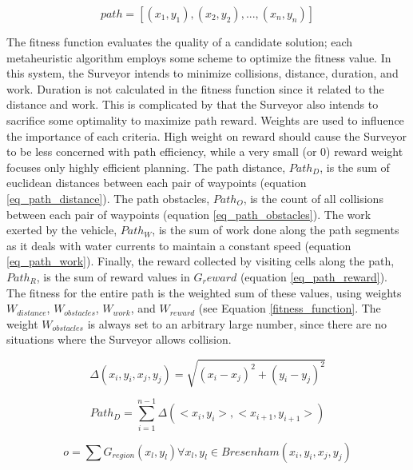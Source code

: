\documentclass{tamuccthesis}
\begin{document}
\begin{equation}
path = [ (x_{1}, y_{1}), (x_{2}, y_{2}), ..., (x_{n}, y_{n}) ]
\label{solution_path}
\end{equation}

The fitness function evaluates the quality of a candidate solution; each metaheuristic algorithm employs some scheme to optimize the fitness value. In this system, the Surveyor intends to minimize collisions, distance, duration, and work. Duration is not calculated in the fitness function since it related to the distance and work. This is complicated by that the Surveyor also intends to sacrifice some optimality to maximize path reward. Weights are used to influence the importance of each criteria. High weight on reward should cause the Surveyor to be less concerned with path efficiency, while a very small (or 0) reward weight focuses only highly efficient planning. The path distance, $Path_D$, is the sum of euclidean distances between each pair of waypoints (equation \ref{eq_path_distance}). The path obstacles, $Path_O$, is the count of all collisions between each pair of waypoints (equation \ref{eq_path_obstacles}). The work exerted by the vehicle, $Path_W$, is the sum of work done along the path segments as it deals with water currents to maintain a constant speed (equation \ref{eq_path_work}). Finally, the reward collected by visiting cells along the path, $Path_R$, is the sum of reward values in $G_reward$ (equation \ref{eq_path_reward}). The fitness for the entire path is the weighted sum of these values, using weights $W_{distance}$, $W_{obstacles}$, $W_{work}$, and $W_{reward}$ (see Equation \ref{fitness_function}. The weight $W_{obstacles}$ is always set to an arbitrary large number, since there are no situations where the Surveyor allows collision. 

\begin{equation}
\Delta (x_{i}, y_{i}, x_{j}, y_{j}) = \sqrt{(x_{i} - x_{j})^2 + (y_{i} - y_{j})^2}
\label{eq_distance}
\end{equation}

\begin{equation}
Path_{D} = \sum_{i=1}^{n-1} \Delta (<x_{i}, y_{i}>, <x_{i+1}, y_{i+1}>)
\label{eq_path_distance}
\end{equation}


\begin{equation}
o = \sum G_{region}(x_l, y_l) \forall x_l, y_l \in Bresenham(x_i, y_i, x_j, y_j)
\label{eq_obstacles}
\end{equation}
\end{document}

